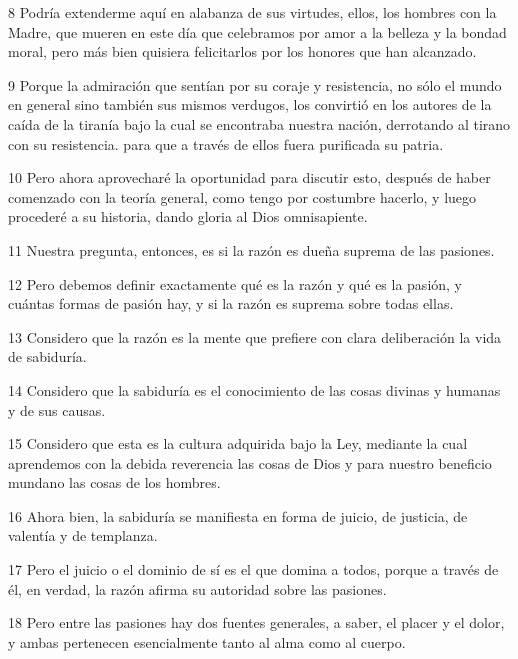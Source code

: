 \par 8 Podría extenderme aquí en alabanza de sus virtudes, ellos, los hombres con la Madre, que mueren en este día que celebramos por amor a la belleza y la bondad moral, pero más bien quisiera felicitarlos por los honores que han alcanzado.

\par 9 Porque la admiración que sentían por su coraje y resistencia, no sólo el mundo en general sino también sus mismos verdugos, los convirtió en los autores de la caída de la tiranía bajo la cual se encontraba nuestra nación, derrotando al tirano con su resistencia. para que a través de ellos fuera purificada su patria.

\par 10 Pero ahora aprovecharé la oportunidad para discutir esto, después de haber comenzado con la teoría general, como tengo por costumbre hacerlo, y luego procederé a su historia, dando gloria al Dios omnisapiente.

\par 11 Nuestra pregunta, entonces, es si la razón es dueña suprema de las pasiones.

\par 12 Pero debemos definir exactamente qué es la razón y qué es la pasión, y cuántas formas de pasión hay, y si la razón es suprema sobre todas ellas.

\par 13 Considero que la razón es la mente que prefiere con clara deliberación la vida de sabiduría.

\par 14 Considero que la sabiduría es el conocimiento de las cosas divinas y humanas y de sus causas.

\par 15 Considero que esta es la cultura adquirida bajo la Ley, mediante la cual aprendemos con la debida reverencia las cosas de Dios y para nuestro beneficio mundano las cosas de los hombres.

\par 16 Ahora bien, la sabiduría se manifiesta en forma de juicio, de justicia, de valentía y de templanza.

\par 17 Pero el juicio o el dominio de sí es el que domina a todos, porque a través de él, en verdad, la razón afirma su autoridad sobre las pasiones.

\par 18 Pero entre las pasiones hay dos fuentes generales, a saber, el placer y el dolor, y ambas pertenecen esencialmente tanto al alma como al cuerpo.

